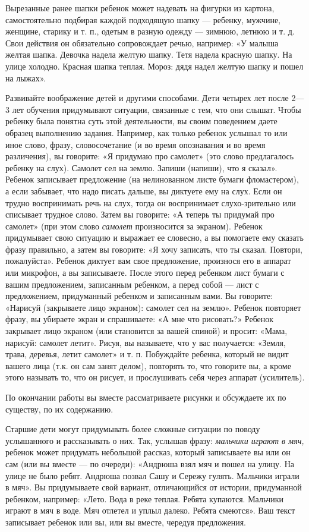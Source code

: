\documentclass{book}
\renewcommand{\emph}[1]{\textit{#1}}
\begin{document}
Вырезанные ранее шапки ребенок может надевать на фигурки из картона,
самостоятельно подбирая каждой подходящую шапку --- ребенку, мужчине,
женщине, старику и т. п., одетым в разную одежду --- зимнюю, летнюю и т.
д. Свои действия он обязательно сопровождает речью, например: «У малыша
желтая шапка. Девочка надела желтую шапку. Тетя надела красную шапку. На
улице холодно. Красная шапка теплая. Мороз: дядя надел желтую шапку и
пошел на лыжах».

Развивайте воображение детей и другими способами. Дети четырех лет после
2---3 лет обучения придумывают ситуации, связанные с тем, что они
слышат. Чтобы ребенку была понятна суть этой деятельности, вы своим
поведением даете образец выполнению задания. Например, как только
ребенок услышал то или иное слово, фразу, словосочетание (и во время
опознавания и во время различения), вы говорите: «Я придумаю про
самолет» (это слово предлагалось ребенку на слух). Самолет сел на землю.
Запиши (напиши), что я сказал». Ребенок записывает предложение (на
нелинованном листе бумаги фломастером), а если забывает, что надо писать
дальше, вы диктуете ему на слух. Если он трудно воспринимать речь на
слух, тогда он воспринимает слухо-зрительно или списывает трудное слово.
Затем вы говорите: «А теперь ты придумай про самолет» (при этом слово
\emph{самолет} произносится за экраном). Ребенок придумывает свою
ситуацию и выражает ее словесно, а вы помогаете ему сказать фразу
правильно, а затем вы говорите: «Я хочу записать, что ты сказал.
Повтори, пожалуйста». Ребенок диктует вам свое предложение, произнося
его в аппарат или микрофон, а вы записываете. После этого перед ребенком
лист бумаги с вашим предложением, записанным ребенком, а перед собой ---
лист с предложением, придуманный ребенком и записанным вами. Вы
говорите: «Нарисуй (закрываете лицо экраном): самолет сел на землю».
Ребенок повторяет фразу, вы убираете экран и спрашиваете: «А мне что
рисовать?» Ребенок закрывает лицо экраном (или становится за вашей
спиной) и просит: «Мама, нарисуй: самолет летит». Рисуя, вы называете,
что у вас получается: «Земля, трава, деревья, летит самолет» и т. п.
Побуждайте ребенка, который не видит вашего лица (т.к. он сам занят
делом), повторять то, что говорите вы, а кроме этого называть то, что он
рисует, и прослушивать себя через аппарат (усилитель).

По окончании работы вы вместе рассматриваете рисунки и обсуждаете их по
существу, по их содержанию.

Старшие дети могут придумывать более сложные ситуации по поводу
услышанного и рассказывать о них. Так, услышав фразу: \emph{мальчики
играют в мяч,} ребенок может придумать небольшой рассказ, который
записываете вы или он сам (или вы вместе --- по очереди): «Андрюша взял
мяч и пошел на улицу. На улице не было ребят. Андрюша позвал Сашу и
Сережу гулять. Мальчики играли в мяч». Вы придумываете свой вариант,
отличающийся от истории, придуманной ребенком, например: «Лето. Вода в
реке теплая. Ребята купаются. Мальчики играют в мяч в воде. Мяч отлетел
и уплыл далеко. Ребята смеются». Ваш текст записывает ребенок или вы,
или вы вместе, чередуя предложения.
\end{document}
